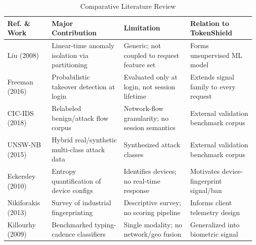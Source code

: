 \documentclass[conference]{IEEEtran}
\begin{document}
\begin{table}[!htbp]
\caption{Comparative Literature Review}
\label{tab:related_work}
\centering
\scriptsize
\renewcommand{\arraystretch}{1.3}
\begin{tabularx}{\linewidth}{>{\raggedright\arraybackslash}p{1.85cm} >{\raggedright\arraybackslash}X >{\raggedright\arraybackslash}X >{\raggedright\arraybackslash}X}
\toprule
\textbf{Ref. \& Work} & \textbf{Major Contribution} & \textbf{Limitation} & \textbf{Relation to TokenShield} \\
\midrule
\cite{liu2008isolation} Liu (2008) & Linear-time anomaly isolation via partitioning & Generic; not coupled to request feature set & Forms unsupervised ML model \\
\cite{freeman2016whoareyou} Freeman (2016) & Probabilistic takeover detection at login & Evaluated only at login, not session lifetime & Extends signal family to every request \\
\cite{sharafaldin2018ids2018} CIC-IDS (2018) & Relabeled benign/attack flow corpus & Network-flow granularity; no session semantics & External validation benchmark corpus \\
\cite{moustafa2015unsw} UNSW-NB (2015) & Hybrid real/synthetic multi-class attack data & Synthesized attack classes & External validation benchmark corpus \\
\cite{eckersley2010unique} Eckersley (2010) & Entropy quantification of device configs & Identifies devices; no real-time response & Motivates device-fingerprint signal/ban \\
\cite{nikiforakis2013cookieless} Nikiforakis (2013) & Survey of industrial fingerprinting & Descriptive survey; no scoring pipeline & Informs client telemetry design \\
\cite{killourhy2009keystroke} Killourhy (2009) & Benchmarked typing-cadence classifiers & Single modality; no network/geo fusion & Generalized into biometric signal \\
\bottomrule
\end{tabularx}
\end{table}

\end{document}
